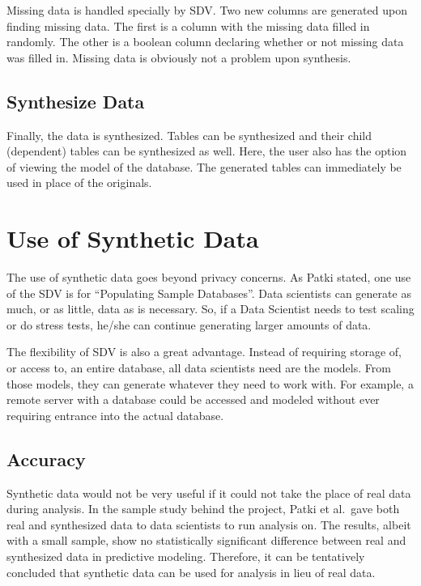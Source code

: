 Missing data is handled specially by SDV. Two new columns are generated
upon finding missing data. The first is a column with the missing data
filled in randomly. The other is a boolean column declaring whether or not
missing data was filled in. Missing data is obviously not a problem upon
synthesis.\cite{hid-sp18-526-patki-wedge-veer-sdv}

\subsection{Synthesize Data}

Finally, the data is synthesized. Tables can be synthesized and their child
(dependent) tables can be synthesized as well. Here, the user also has
the option of viewing the model of the database. The generated tables can
immediately be used in place of the originals.\cite{hid-sp18-526-patki-wedge-veer-sdv}

\section{Use of Synthetic Data}

The use of synthetic data goes beyond privacy concerns. As Patki stated, one
use of the SDV is for ``Populating Sample Databases''\cite{hid-sp18-526-patki-sdv}. Data
scientists can generate as much, or as little, data as is necessary. So,
if a Data Scientist needs to test scaling or do stress tests, he/she can
continue generating larger amounts of data.

The flexibility of SDV is also a great advantage. Instead of requiring
storage of, or access to, an entire database, all data scientists need are
the models. From those models, they can generate whatever they need to work
with. For example, a remote server with a database could be accessed and
modeled without ever requiring entrance into the actual database.

\subsection{Accuracy}

Synthetic data would not be very useful if it could not take the place of
real data during analysis. In the sample study behind the project, Patki et
al.\ gave both real and synthesized data to data scientists to run analysis
on. The results, albeit with a small sample, show no statistically significant
difference between real and synthesized data in predictive modeling. Therefore,
it can be tentatively concluded that synthetic data can be used for analysis
in lieu of real data.\cite{hid-sp18-526-patki-wedge-veer-sdv}

